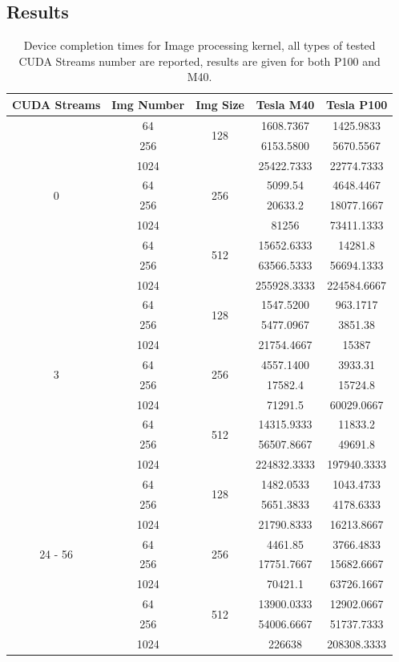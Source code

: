 \subsection{Results}
\begin{table}	
	\centering	
	\vspace*{-1cm}
	\begin{tabular}{ | c |  c c  || c | c | } 
		\hline

		CUDA Streams &	Img Number & Img Size & Tesla M40 & Tesla P100\\
		\hline\hline
		\multirow{8}{*}{0}&	64&	\multirow{2}{*}{128}&	1608.7367&	1425.9833\\
		&	256& &	6153.5800&	5670.5567\\
		&	1024& & 25422.7333&	22774.7333\\
		&	64&	\multirow{2}{*}{256}&	5099.54 &	4648.4467\\
		&	256&	&	20633.2 &	18077.1667\\
		&	1024&	&	81256 &	73411.1333\\
		&	64&	\multirow{2}{*}{512}&	15652.6333&	14281.8 \\
		&	256& &	63566.5333&	56694.1333\\
		&	1024& &	255928.3333&	224584.6667\\
		\hline
		\multirow{8}{*}{3}&	64&	\multirow{2}{*}{128}&	1547.5200&	963.1717\\
		&	256&	&	5477.0967&	3851.38\\
		&	1024&	&	21754.4667&	15387\\
		&	64&	\multirow{2}{*}{256}&	4557.1400&	3933.31\\
		&	256&	&	17582.4&	15724.8\\
		&	1024&	&	71291.5&	60029.0667\\
		&	64&	\multirow{2}{*}{512}&	14315.9333&	11833.2\\
		&	256&	&	56507.8667&	49691.8\\
		&	1024&	&	224832.3333&	197940.3333\\
		\hline
		\multirow{8}{*}{24 - 56}&	64&	\multirow{2}{*}{128}&	1482.0533&	1043.4733\\
		&	256&	&	5651.3833&	4178.6333\\
		&	1024&	&	21790.8333&	16213.8667\\
		&	64&	\multirow{2}{*}{256}&	4461.85&	3766.4833\\
		&	256&	&	17751.7667&	15682.6667\\
		&	1024&	&	70421.1&	63726.1667\\
		&	64&	\multirow{2}{*}{512}&	13900.0333&	12902.0667\\
		&	256&	&	54006.6667&	51737.7333\\
		&	1024&	&	226638&	208308.3333\\	
		\hline	
	\end{tabular}
	\caption{Device completion times for Image processing kernel, all types of tested CUDA Streams number are reported, results are given for both P100 and M40.}	
	\label{tab:imgavgs}		
\end{table}

